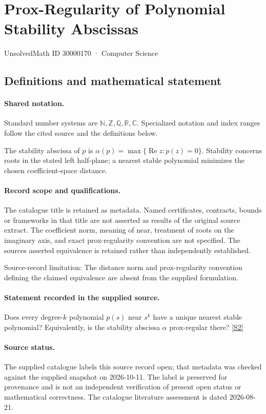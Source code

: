 \documentclass[11pt]{article}
\newcommand{\sref}[2]{\hyperlink{source:#1:#2}{[S#2]}}
\begin{document}
\setcounter{section}{30000169}
\section{Prox-Regularity of Polynomial Stability Abscissas}\label{30000170}
{\small\sffamily UnsolvedMath ID 30000170 · Computer Science}
\subsection{Definitions and mathematical statement}

\paragraph{Shared notation.}Standard number systems are $\mathbb N,\mathbb Z,\mathbb Q,\mathbb R,\mathbb C$. Specialized notation and index ranges follow the cited source and the definitions below.


The stability abscissa of $p$ is $\alpha(p)=\max\{\operatorname{Re}z:p(z)=0\}$. Stability concerns roots in the stated left half-plane; a nearest stable polynomial minimizes the chosen coefficient-space distance.
\paragraph{Record scope and qualifications.}
The catalogue title is retained as metadata. Named certificates, contracts, bounds or frameworks in that title are not asserted as results of the original source extract.
The coefficient norm, meaning of near, treatment of roots on the imaginary axis, and exact prox-regularity convention are not specified. The source\textquotesingle s asserted equivalence is retained rather than independently established.

Source-record limitation: The distance norm and prox-regularity convention defining the claimed equivalence are absent from the supplied formulation.
\paragraph{Statement recorded in the supplied source.}
Does every degree-$k$ polynomial $p(s)$ near $s^k$ have a unique nearest stable polynomial? Equivalently, is the stability abscissa $\alpha$ prox-regular there? \sref{30000170}{2}
\paragraph{Source status.}
The supplied catalogue labels this source record open; that metadata was checked against the supplied snapshot on 2026-10-11. The label is preserved for provenance and is not an independent verification of present open status or mathematical correctness. The catalogue literature assessment is dated 2026-08-21.
\end{document}
